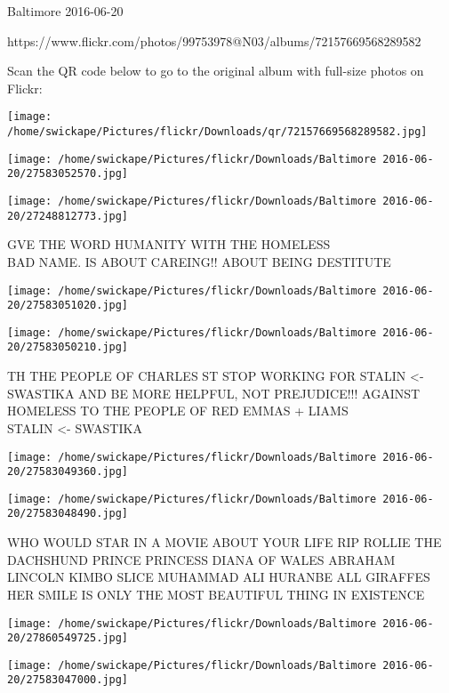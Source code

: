 \documentclass[10pt,letterpaper]{article}
\begin{document}
Baltimore 2016-06-20

https://www.flickr.com/photos/99753978@N03/albums/72157669568289582

Scan the QR code below to go to the original album with full-size photos on Flickr:

\texttt{[image: /home/swickape/Pictures/flickr/Downloads/qr/72157669568289582.jpg]}
\pagebreak

\texttt{[image: /home/swickape/Pictures/flickr/Downloads/Baltimore 2016-06-20/27583052570.jpg]}

\vspace{0.25in}
\texttt{[image: /home/swickape/Pictures/flickr/Downloads/Baltimore 2016-06-20/27248812773.jpg]}

GVE THE WORD HUMANITY WITH THE HOMELESS\\
BAD NAME.  IS ABOUT CAREING!! ABOUT BEING DESTITUTE
\pagebreak

\texttt{[image: /home/swickape/Pictures/flickr/Downloads/Baltimore 2016-06-20/27583051020.jpg]}

\vspace{0.25in}
\texttt{[image: /home/swickape/Pictures/flickr/Downloads/Baltimore 2016-06-20/27583050210.jpg]}

TH THE PEOPLE OF CHARLES ST STOP WORKING FOR STALIN <{-} SWASTIKA AND BE MORE HELPFUL, NOT PREJUDICE!!! AGAINST HOMELESS TO THE PEOPLE OF RED EMMAS + LIAMS\\
STALIN <{-} SWASTIKA
\pagebreak

\texttt{[image: /home/swickape/Pictures/flickr/Downloads/Baltimore 2016-06-20/27583049360.jpg]}

\vspace{0.25in}
\texttt{[image: /home/swickape/Pictures/flickr/Downloads/Baltimore 2016-06-20/27583048490.jpg]}

WHO WOULD STAR IN A MOVIE ABOUT YOUR LIFE RIP ROLLIE THE DACHSHUND PRINCE PRINCESS DIANA OF WALES ABRAHAM LINCOLN KIMBO SLICE MUHAMMAD ALI HURANBE ALL GIRAFFES\\
HER SMILE IS ONLY THE MOST BEAUTIFUL THING IN  EXISTENCE
\pagebreak

\texttt{[image: /home/swickape/Pictures/flickr/Downloads/Baltimore 2016-06-20/27860549725.jpg]}

\vspace{0.25in}
\texttt{[image: /home/swickape/Pictures/flickr/Downloads/Baltimore 2016-06-20/27583047000.jpg]}
\end{document}
